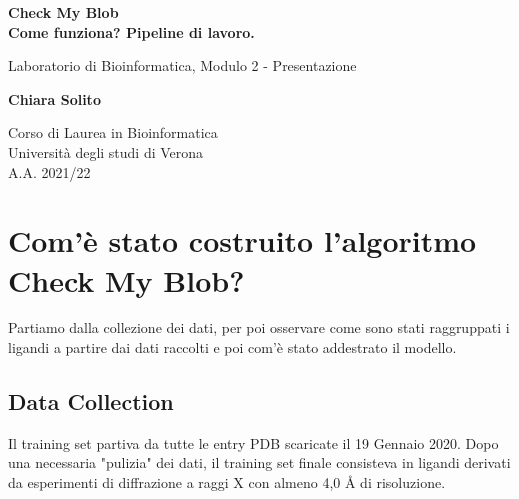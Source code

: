 \documentclass{article}
\begin{document}
\newcommand\tab[1][0.3cm]{\hspace*{#1}}


\begin{titlepage}
    \begin{center}
        \vspace*{1cm}
            
        \Huge
        \textbf{Check My Blob}\\
        \LARGE
        \textbf{Come funziona? Pipeline di lavoro.}
            
        \vspace{0.5cm}
        \LARGE
        Laboratorio di Bioinformatica, Modulo 2 - Presentazione
            
        \vspace{1.5cm}
            
        \textbf{Chiara Solito}

        \vspace{0.8cm}

            
        \Large
        Corso di Laurea in Bioinformatica\\
        Università degli studi di Verona\\
        A.A. 2021/22
            
    \end{center}
\end{titlepage}

\newpage
\thispagestyle{empty}
\section{Com'è stato costruito l'algoritmo Check My Blob?}
Partiamo dalla collezione dei dati, per poi osservare come sono stati raggruppati i ligandi a partire dai dati raccolti e poi com'è stato addestrato il modello.
\subsection{Data Collection}
Il training set partiva da tutte le entry PDB scaricate il 19 Gennaio 2020. Dopo una necessaria "pulizia" dei dati, il training set finale consisteva in ligandi derivati da esperimenti di diffrazione a raggi X con almeno 4,0 Å di risoluzione.
\end{document}
